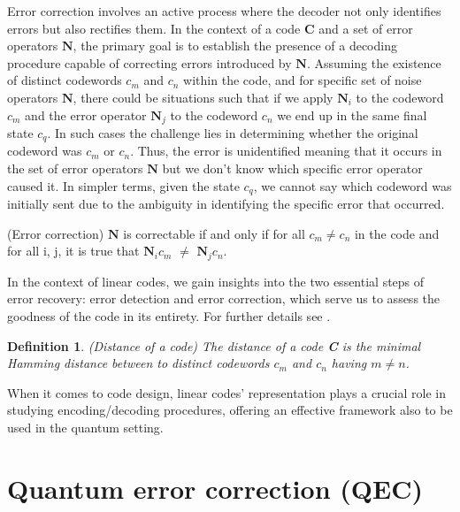 \documentclass{Configuration_Files/PoliMi3i_thesis}
\newtheorem{definition}{Definition}[chapter]
\begin{document}
Error correction involves an active process where the decoder not only identifies errors but also rectifies them. 
In the context of a code $\textbf{C}$ and a set of error operators $\textbf{N}$, the primary goal is to establish the presence of a decoding procedure capable of correcting errors introduced by $\textbf{N}$. 
Assuming the existence of distinct codewords $c_m$ and $c_n$ within the code, and for specific set of noise operators $\textbf{N}$, there could be situations such that if we apply $\textbf{N}_i$ to the codeword $c_m$ and the error operator $\textbf{N}_j$ to the codeword $c_n$ we end up in the same final state $c_q$. In such cases the challenge lies in determining whether the original codeword was $c_m$ or $c_n$. Thus, the error is unidentified meaning that it occurs in the set of error operators $\textbf{N}$ but we don't know which specific error operator caused it. In simpler terms, given the state $c_q$, we cannot say which codeword was initially sent due to the ambiguity in identifying the specific error that occurred.

\begin{theorem}(Error correction)
	$\textbf{N}$ is correctable if and only if for all $c_m \neq c_n$ in the code and for all i, j, it is true that $\textbf{N}_ic_m$ $\neq$ $\textbf{N}_jc_n$. 
\end{theorem} 

In the context of linear codes, we gain insights into the two essential steps of error recovery: error detection and error correction, which serve us to assess the goodness of the code in its entirety. For further details see \cite{Kas19}.

\begin{definition}(Distance of a code)
	The distance of a code {\bf C } is the minimal Hamming distance between to distinct codewords $c_m$ and $c_n$ having $m \neq n$.
\end{definition}
	
When it comes to code design, linear codes' representation plays a crucial role in studying encoding/decoding procedures, offering an effective framework also to be used in the quantum setting.






\newpage
\section{Quantum error correction (QEC)}
\label{sec:QEC}
\end{document}
